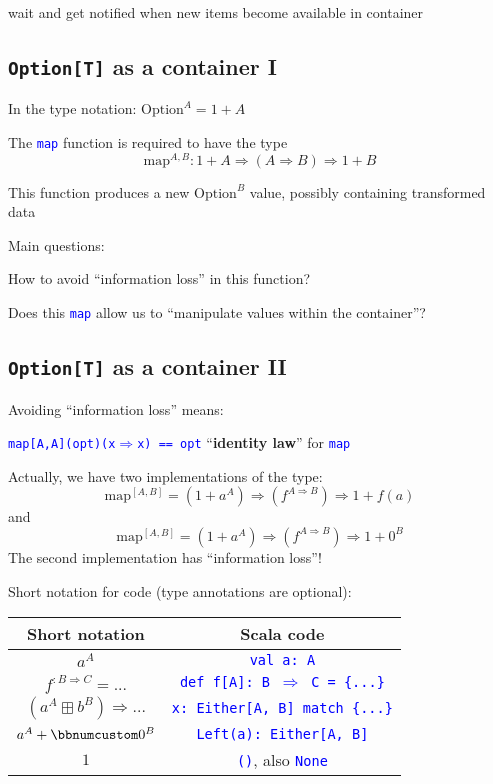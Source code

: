 wait and get notified when new items become available in container

\subsection{\texttt{Option{[}T{]}} as a container I}

In the type notation: $\text{Option}^{A}=1+A$

The \texttt{\textcolor{blue}{\footnotesize{}map}} function is required
to have the type
\[
\text{map}^{A,B}:1+A\Rightarrow\left(A\Rightarrow B\right)\Rightarrow1+B
\]

This function produces a new $\text{Option}^{B}$ value, possibly
containing transformed data

Main questions:

How to avoid ``information loss'' in this function?

Does this \texttt{\textcolor{blue}{\footnotesize{}map}} allow us to
``manipulate values within the container''?


\subsection{\texttt{Option{[}T{]}} as a container II}

Avoiding ``information loss'' means:

\texttt{\textcolor{blue}{\footnotesize{}map{[}A,A{]}(opt)(x$\Rightarrow$x)
== opt}} \textendash{} ``\textbf{identity law}'' for \texttt{\textcolor{blue}{\footnotesize{}map}}{\footnotesize\par}

Actually, we have two implementations of the type: 
\[
\text{map}^{[A,B]}=(1+a^{A})\Rightarrow(f^{A\Rightarrow B})\Rightarrow1+f(a)
\]
and
\[
\text{map}^{[A,B]}=(1+a^{A})\Rightarrow(f^{A\Rightarrow B})\Rightarrow1+0^{B}
\]
The second implementation has ``information loss''!

Short notation for code (type annotations are optional):
\begin{center}
\begin{tabular}{|c|c|}
\hline 
\textbf{Short notation} & \textbf{Scala code}\tabularnewline
\hline 
\hline 
$a^{A}$ & \texttt{\textcolor{blue}{\footnotesize{}val a: A}}\tabularnewline
\hline 
$f^{:B\Rightarrow C}=...$ & \texttt{\textcolor{blue}{\footnotesize{}def f{[}A{]}: B $\Rightarrow$
C = \{...\}}}\tabularnewline
\hline 
$(a^{A}\boxplus b^{B})\Rightarrow...$ & \texttt{\textcolor{blue}{\footnotesize{}x: Either{[}A, B{]} match
\{...\}}}\tabularnewline
\hline 
$a^{A}+\bbnum 0^{B}$ & \texttt{\textcolor{blue}{\footnotesize{}Left(a):\ Either{[}A, B{]}}}\tabularnewline
\hline 
$1$ & \texttt{\textcolor{blue}{\footnotesize{}()}}, also \texttt{\textcolor{blue}{\footnotesize{}None}}\tabularnewline
\hline 
\end{tabular}
\par\end{center}


